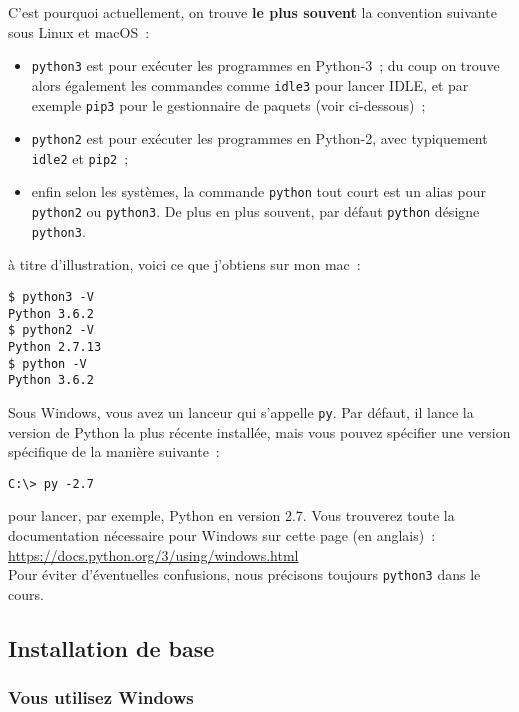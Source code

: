 C'est pourquoi actuellement, on trouve \textbf{le plus souvent} la
convention suivante sous Linux et macOS~:

\begin{itemize}
\item
  \texttt{python3} est pour exécuter les programmes en Python-3~; du
  coup on trouve alors également les commandes comme \texttt{idle3} pour
  lancer IDLE, et par exemple \texttt{pip3} pour le gestionnaire de
  paquets (voir ci-dessous)~;
\item
  \texttt{python2} est pour exécuter les programmes en Python-2, avec
  typiquement \texttt{idle2} et \texttt{pip2}~;
\item
  enfin selon les systèmes, la commande \texttt{python} tout court est
  un alias pour \texttt{python2} ou \texttt{python3}. De plus en plus
  souvent, par défaut \texttt{python} désigne \texttt{python3}.
\end{itemize}

à titre d'illustration, voici ce que j'obtiens sur mon mac~:

\begin{verbatim}
$ python3 -V
Python 3.6.2
$ python2 -V
Python 2.7.13
$ python -V
Python 3.6.2
\end{verbatim}

Sous Windows, vous avez un lanceur qui s'appelle \texttt{py}. Par
défaut, il lance la version de Python la plus récente installée, mais
vous pouvez spécifier une version spécifique de la manière suivante~:

\begin{verbatim}
C:\> py -2.7
\end{verbatim}

pour lancer, par exemple, Python en version 2.7. Vous trouverez toute la
documentation nécessaire pour Windows sur cette page (en anglais)~:
\href{https://docs.python.org/3/using/windows.html}{https://docs.python.org/3/using/windows.html}\\

Pour éviter d'éventuelles confusions, nous précisons toujours
\texttt{python3} dans le cours.

    \hypertarget{installation-de-base}{%
\subsection{Installation de base}\label{installation-de-base}}

    \hypertarget{vous-utilisez-windows}{%
\subsubsection{Vous utilisez Windows}\label{vous-utilisez-windows}}

